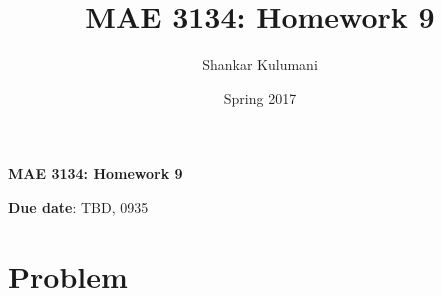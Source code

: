 \documentclass[11pt, reqno]{article}    %
\title{MAE 3134: Homework 9}
\author{Shankar Kulumani}
\date{Spring 2017}                          %
\begin{document}
{\noindent\Large \textbf{MAE 3134: Homework 9}}

\noindent \textbf{Due date}: TBD, 0935 \\
\section{Problem}
\end{document}
